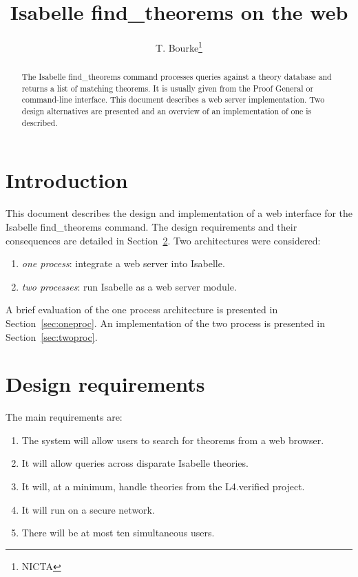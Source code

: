 \documentclass[a4paper,draft]{article} %
\title{Isabelle find\_theorems on the web}
\author{T. Bourke\thanks{NICTA}}
\newcommand{\refsec}[1]{Section~\ref{sec:#1}}
\begin{document}
\maketitle

\begin{abstract}
The Isabelle find\_theorems command processes queries against a theory 
database and returns a list of matching theorems.
It is usually given from the Proof General or command-line interface.
This document describes a web server implementation.
Two design alternatives are presented and an overview of an implementation 
of one is described.
\end{abstract}

\section{Introduction}\label{sec:intro}

This document describes the design and implementation of a web interface for 
the Isabelle find\_theorems command.
The design requirements and their consequences are detailed in \refsec{req}.
Two architectures were considered: \begin{enumerate}

\item \emph{one process}: integrate a web server into Isabelle.

\item \emph{two processes}: run Isabelle as a web server module.

\end{enumerate}
A brief evaluation of the one process architecture is presented in 
\refsec{oneproc}.
An implementation of the two process is presented in \refsec{twoproc}.

\section{Design requirements}\label{sec:req}

The main requirements are:\begin{enumerate}
\item The system will allow users to search for theorems from a web browser.
\item It will allow queries across disparate Isabelle theories.
\item It will, at a minimum, handle theories from the L4.verified project.
\item It will run on a secure network.
\item There will be at most ten simultaneous users.
\end{enumerate}
\end{document}
